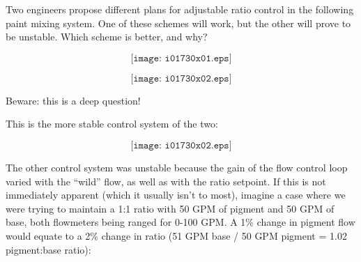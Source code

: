 

Two engineers propose different plans for adjustable ratio control in the following paint mixing system.  One of these schemes will work, but the other will prove to be unstable.  Which scheme is better, and why?

$$\texttt{[image: i01730x01.eps]}$$

\vskip 10pt

$$\texttt{[image: i01730x02.eps]}$$

Beware: this is a deep question!







This is the more stable control system of the two:

$$\texttt{[image: i01730x02.eps]}$$

The other control system was unstable because the gain of the flow control loop varied with the ``wild'' flow, as well as with the ratio setpoint.  If this is not immediately apparent (which it usually isn't to most), imagine a case where we were trying to maintain a 1:1 ratio with 50 GPM of pigment and 50 GPM of base, both flowmeters being ranged for 0-100 GPM.  A 1\% change in pigment flow would equate to a 2\% change in ratio (51 GPM base / 50 GPM pigment = 1.02 pigment:base ratio):











